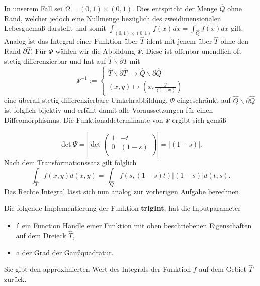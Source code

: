 \documentclass[a4paper,11pt,bibliography=totoc,listof=totoc,headinclude=true,cleardoublepage=empty,oneside]{scrbook}
\newcommand{\code}[1]{\texttt{\color{change}#1}}
\begin{document}
In unserem Fall sei $\Omega=(0,1)\times(0,1)$. Dies entspricht der Menge $\hat{Q}$ ohne Rand, welcher jedoch eine Nullmenge bezüglich des zweidimensionalen Lebesguemaß darstellt und somit $\int_{(0,1)\times(0,1)}f(x)dx = \int_{\hat{Q}}f(x)dx$ gilt. Analog ist das Integral einer Funktion über $\hat{T}$ ident mit jenem über $\hat{T}$ ohne den Rand $\partial\hat{T}$. Für $\Phi$ wählen wir die Abbildung $\Psi$. Diese ist offenbar unendlich oft stetig differenzierbar und hat auf $\hat{T}\backslash\partial\hat{T}$ mit 
\begin{equation*} 
	\Psi^{-1} := \begin{cases} 
	\hat{T}\backslash\partial\hat{T}\ \to \hat{Q}\backslash\partial\hat{Q} \\
	(x,y) \mapsto (x,\frac{y}{(1-x)})
	\end{cases} 
\end{equation*} 
eine überall stetig differenzierbare Umkehrabbildung. $\Psi$ eingeschränkt auf $\hat{Q}\backslash\partial\hat{Q}$ ist folglich bijektiv und erfüllt damit alle Voraussetzungen für einen Diffeomorphismus. Die Funktionaldeterminante von $\Psi$ ergibt sich gemäß
		
\begin{equation*}
	\det \Psi = |\det		
	\left(
	\begin{array}{cc}
	1 & -t \\
	0 & (1-s)\\
	\end{array}
	\right)| = |(1-s)|.
\end{equation*}
Nach dem Transformationssatz gilt folglich
\begin{equation*} \label{eq1}
	\int_{\hat{T}}f(x,y)d(x,y) = \int_{\hat{Q}}f(s,(1-s)t)|(1-s)|d(t,s).
\end{equation*}
Das Rechte Integral lässt sich nun analog zur vorherigen Aufgabe berechnen. 

Die folgende Implementierung der Funktion \textbf{trigInt}, hat die Inputparameter
\begin{itemize}
	\item \code{f} ein Function Handle einer Funktion mit oben beschriebenen Eigenschaften auf dem Dreieck $\hat{T}$,
	\item \code{n} der Grad der Gaußquadratur.
\end{itemize} 
Sie gibt den approximierten Wert des Integrals der Funktion $f$ auf dem Gebiet $\hat{T}$ zurück.
		
{\color{change}
\lstset{ 
	language=Matlab, 
	showstringspaces=false}
}
\end{document}
